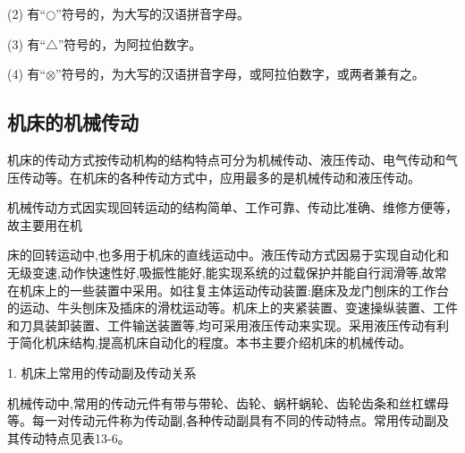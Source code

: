 \documentclass[UTF8]{ctexbook}
\newcommand{\◎}{\ensuremath{\bigcirc}}
\begin{document}
(2) 有“$\bigcirc$”符号的，为大写的汉语拼音字母。

(3) 有“$\triangle$”符号的，为阿拉伯数字。

(4) 有“$\otimes$”符号的，为大写的汉语拼音字母，或阿拉伯数字，或两者兼有之。

\subsection{机床的机械传动}
机床的传动方式按传动机构的结构特点可分为机械传动、液压传动、电气传动和气压传动等。在机床的各种传动方式中，应用最多的是机械传动和液压传动。

机械传动方式因实现回转运动的结构简单、工作可靠、传动比准确、维修方便等，故主要用在机

床的回转运动中,也多用于机床的直线运动中。液压传动方式因易于实现自动化和无级变速,动作快速性好,吸振性能好,能实现系统的过载保护并能自行润滑等,故常在机床上的一些装置中采用。如往复主体运动传动装置:磨床及龙门刨床的工作台的运动、牛头刨床及插床的滑枕运动等。机床上的夹紧装置、变速操纵装置、工件和刀具装卸装置、工件输送装置等,均可采用液压传动来实现。采用液压传动有利于简化机床结构,提高机床自动化的程度。本书主要介绍机床的机械传动。

1. 机床上常用的传动副及传动关系

机械传动中,常用的传动元件有带与带轮、齿轮、蜗杆蜗轮、齿轮齿条和丝杠螺母等。每一对传动元件称为传动副,各种传动副具有不同的传动特点。常用传动副及其传动特点见表13-6。
\end{document}
